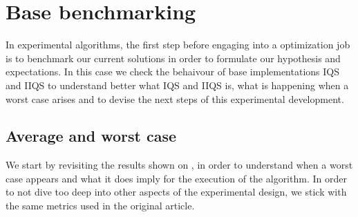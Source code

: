 \section{Base benchmarking}
\label{SUBSECTION:BASE_BENCHMARK}
In experimental algorithms, the first step before engaging into a optimization job is to benchmark our current solutions in order to formulate our hypothesis and expectations. In this case we check the behaivour of base implementations IQS and IIQS to understand better what IQS and IIQS is, what is happening when a worst case arises and to devise the next steps of this experimental development.\\

\subsection{Average and worst case}
\label{SUBSECTION:BASE_BENCHMARK__AVERAGE_WORST}

We start by revisiting the results shown on \cite{7416566}, in order to understand when a worst case appears and what it does imply for the execution of the algorithm. In order to not dive too deep into other aspects of the experimental design, we stick with the same metrics used in the original article.\\

